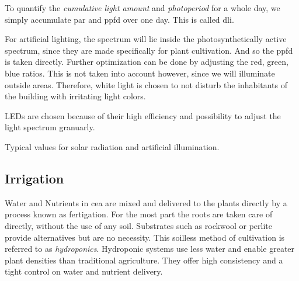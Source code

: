 To quantify the \textit{cumulative light amount} and \textit{photoperiod} for a whole day, we simply accumulate \ac{par} and \ac{ppfd} over one day.
This is called \ac{dli}.

For artificial lighting, the spectrum will lie inside the photosynthetically active spectrum, since they are made specifically for plant cultivation.
And so the ppfd is taken directly.
Further optimization can be done by adjusting the red, green, blue ratios.
This is not taken into account however, since we will illuminate outside areas.
Therefore, white light is chosen to not disturb the inhabitants of the building with irritating light colors.

LEDs are chosen because of their high efficiency and possibility to adjust the light spectrum granuarly.

Typical values for solar radiation and artificial illumination.



\subsection{Irrigation}
\label{sub:fund-cea-irr}
Water and Nutrients in \ac{cea} are mixed and delivered to the plants directly by a process known as fertigation.
For the most part the roots are taken care of directly, without the use of any soil.
Substrates such as rockwool or perlite provide alternatives but are no necessity.
This soilless method of cultivation is referred to as \textit{hydroponics}.
Hydroponic systems use less water and enable greater plant densities than traditional agriculture.
They offer high consistency and a tight control on water and nutrient delivery.

